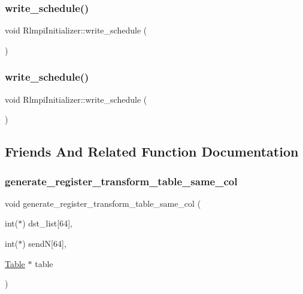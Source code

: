 \subsubsection{\texorpdfstring{write\_schedule()}{write\_schedule()}\hspace{0.1cm}{\footnotesize\ttfamily [1/2]}}
{\footnotesize\ttfamily void Rlmpi\+Initializer\+::write\+\_\+schedule (\begin{DoxyParamCaption}{ }\end{DoxyParamCaption})}

\mbox{\label{classRlmpiInitializer_a97d48ddb124af75c09509e63cc327246}} 
\subsubsection{\texorpdfstring{write\_schedule()}{write\_schedule()}\hspace{0.1cm}{\footnotesize\ttfamily [2/2]}}
{\footnotesize\ttfamily void Rlmpi\+Initializer\+::write\+\_\+schedule (\begin{DoxyParamCaption}{ }\end{DoxyParamCaption})}



\subsection{Friends And Related Function Documentation}
\mbox{\label{classRlmpiInitializer_ac67b230ec20837a9ead28023dcfe7332}} 
\subsubsection{\texorpdfstring{generate\_register\_transform\_table\_same\_col}{generate\_register\_transform\_table\_same\_col}\hspace{0.1cm}{\footnotesize\ttfamily [1/2]}}
{\footnotesize\ttfamily void generate\+\_\+register\+\_\+transform\+\_\+table\+\_\+same\+\_\+col (\begin{DoxyParamCaption}\item[{int($\ast$)}]{dst\+\_\+list\mbox{[}64\mbox{]},  }\item[{int($\ast$)}]{sendN\mbox{[}64\mbox{]},  }\item[{\mbox{\hyperlink{structTable}{Table}} $\ast$}]{table }\end{DoxyParamCaption})\hspace{0.3cm}{\ttfamily [friend]}}

